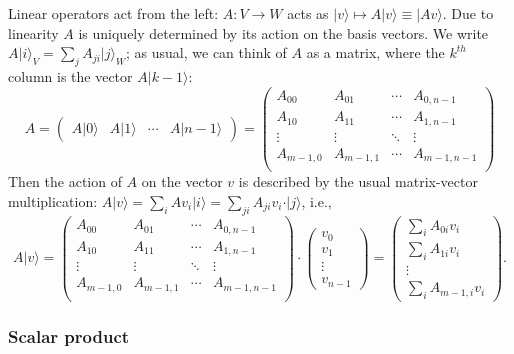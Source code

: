 \documentclass{article}
\theoremstyle{definition}
\newcommand{\ket}[1]{\vert #1 \rangle}
\begin{document}
Linear operators act from the left: $A: V\to W$ acts as $\ket{v}\mapsto A\ket{v} \equiv \ket{Av}$. Due to linearity $A$ is uniquely determined by its action on the basis vectors. We write $A\ket{i}_V = \sum_{j} A_{ji} \ket{j}_W$; as usual, we can think of $A$ as a matrix, where the $k^{th}$ column is the vector $A\ket{k-1}$:
\begin{equation*}
  A = \begin{pmatrix} A\ket{0} & A\ket{1} & \cdots & A\ket{n-1} \end{pmatrix} = 
  \begin{pmatrix}
    A_{00} & A_{01} & \cdots & A_{0, {n-1}} \\
    A_{10} & A_{11} & \cdots & A_{1, {n-1}} \\
    \vdots & \vdots & \ddots & \vdots \\
    A_{m-1,0} & A_{m-1,1} & \cdots & A_{m-1, {n-1}} \\    
  \end{pmatrix}
\end{equation*}
Then the action of $A$ on the vector $v$ is described by the usual matrix-vector multiplication: $A\ket{v} = \sum_{i} A v_i \ket{i} = \sum_{ji} A_{ji} v_i \cdot \ket{j}$, i.e., 
\begin{equation*}
  A \ket{v} = 
  \begin{pmatrix}
    A_{00} & A_{01} & \cdots & A_{0, {n-1}} \\
    A_{10} & A_{11} & \cdots & A_{1, {n-1}} \\
    \vdots & \vdots & \ddots & \vdots \\
    A_{m-1,0} & A_{m-1,1} & \cdots & A_{m-1, {n-1}} \\    
  \end{pmatrix} \cdot \begin{pmatrix} v_0 \\ v_1 \\ \vdots \\ v_{n-1} \end{pmatrix} = 
  \begin{pmatrix} \sum_i A_{0i} v_i \\ \sum_i A_{1i}v_i \\ \vdots \\ \sum_i A_{m-1,i}v_{i} \end{pmatrix}.
\end{equation*}

\subsubsection{Scalar product}
\end{document}
